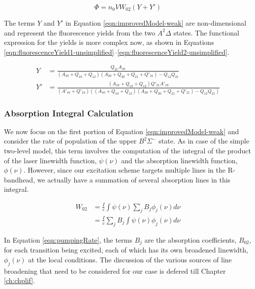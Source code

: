 \begin{equation}
  \Phi = n_0VW_{02}(Y + Y')
  \label{eqn:improvedModel-weak}
\end{equation}

The terms \(Y\) and \(Y'\) in Equation \ref{eqn:improvedModel-weak} are non-dimensional and represent the fluorescence yields from the two \(A^2\Delta\) states.
The functional expression for the yields is more complex now, as shown in Equations \ref{eqn:fluorescenceYield1-unsimplified}--\ref{eqn:fluorescenceYield2-unsimplified}.

\begin{align}
  Y &= \frac{ Q_{21} A_{10} }{ ( A_{10} + Q_{10} + Q_{12} )( A_{20} + Q_{20} + Q_{21} + Q'_{21} ) - Q_{12}Q_{21} }
  \label{eqn:fluorescenceYield1-unsimplified}\\
  Y' &= \frac{ ( A_{10} + Q_{10} + Q_{12} )Q'_{21} A'_{10} }{ ( A'_{10} + Q'_{10} ) ( ( A_{10} + Q_{10} + Q_{12} )( A_{20} + Q_{20} + Q_{21} + Q'_{21} ) - Q_{12}Q_{21} ) }
  \label{eqn:fluorescenceYield2-unsimplified}
\end{align}

\subsubsection{Absorption Integral Calculation}
\label{subsubsec:improved-model-absorption-integral-calculation}

We now focus on the first portion of Equation \ref{eqn:improvedModel-weak} and consider the rate of population of the upper \(B^2\Sigma^-\) state.
As in case of the simple two-level model, this term involves the computation of the integral of the product of the laser linewidth function, \(\psi(\nu)\) and the absorption linewidth function, \(\phi(\nu)\).
However, since our excitation scheme targets multiple lines in the R-bandhead, we actually have a summation of several absorption lines in this integral.

\begin{align}
  W_{02} & = \frac{I}{c} \int \psi(\nu) \sum_j B_j \phi_j (\nu) d\nu \nonumber \\
        & = \frac{I}{c} \sum_j B_j \int \psi(\nu)\phi_j(\nu) d\nu
  \label{eqn:pumpingRate}
\end{align}

In Equation \ref{eqn:pumpingRate}, the terms \(B_j\) are the absorption coefficients, \(B_{02}\), for each transition being excited, each of which has its own broadened linewidth, \(\phi_j(\nu)\) at the local conditions.
The discussion of the various sources of line broadening that need to be considered for our case is defered till Chapter \ref{ch:chplif}.

